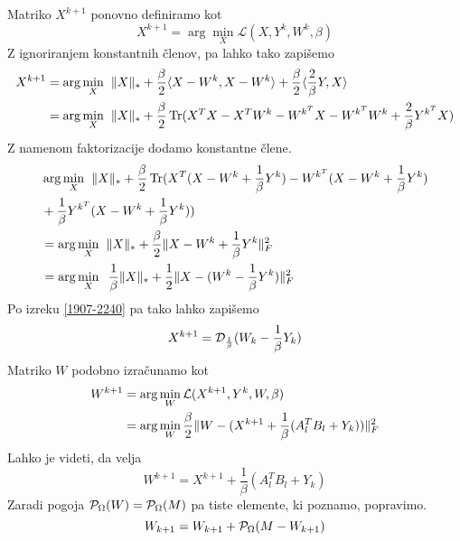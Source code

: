 Matriko $X^{k+1}$ ponovno definiramo kot
\[
    X^{k+1} = \arg \min_X \mathcal{L}(X, Y^k, W^k, \beta)
\]
Z ignoriranjem konstantnih členov, pa lahko tako zapišemo
\begin{align*}
    X^{k+1} & = \arg \min_X \hspace{0.2cm} \lVert X\rVert_* + \frac{\beta}{2}\langle X-W^k, X-W^k \rangle + \frac{\beta}{2}\langle \frac{2}{\beta}Y, X \rangle       \\
            & = \arg \min_X \hspace{0.2cm} \lVert X\rVert_* + \frac{\beta}{2}\operatorname{Tr}(X^TX - X^TW^k - W^{k^T}X - W^{k^T}W^k + \frac{2}{\beta}Y^{k^T}X )
\end{align*}
Z namenom faktorizacije dodamo konstantne člene.
\begin{align*}
     & \arg \min_X \hspace{0.2cm} \lVert X\rVert_* + \frac{\beta}{2}\operatorname{Tr}(X^T(X - W^k + \frac{1}{\beta}Y^k) - W^{k^T} (X - W^k + \frac{1}{\beta}Y^k) \\
     & +\frac{1}{\beta}Y^{k^T}(X - W^k + \frac{1}{\beta}Y^k))                                                               \\
     & = \arg \min_X \hspace{0.2cm} \lVert X\rVert_* + \frac{\beta}{2} \lVert X-W^k + \frac{1}{\beta}Y^k\rVert_F^2                                       \\
     & = \arg \min_X \hspace{0.2cm} \frac{1}{\beta}\lVert X\rVert_* +  \frac{1}{2}\lVert X-(W^k - \frac{1}{\beta}Y^k)\rVert_F^2
\end{align*}
 Po izreku \ref{1907-2240} pa tako lahko zapišemo
\[
    X^{k+1} = \mathcal{D}_\frac{1}{\beta}(W_k - \frac{1}{\beta} Y_k)
\]
Matriko $W$ podobno izračunamo kot
\begin{align*}
    W^{k+1} & = \arg \min_{W} \mathcal{L}(X^{k+1}, Y^k, W, \beta)                                       \\
            & = \arg \min_W \frac{\beta}{2} \lVert W - (X^{k+1} + \frac{1}{\beta}(A_l^T B_l + Y_k)) \rVert_F^2
\end{align*}
Lahko je videti, da velja
\[
    W^{k+1} = X^{k+1} + \frac{1}{\beta}(A_l^T B_l + Y_k)
\]
Zaradi pogoja $\mathcal{P}_\Omega(W) = \mathcal{P}_\Omega(M)$ pa tiste elemente, ki poznamo, popravimo. \cite{TNNM-HZYLH12}
\begin{equation}
    \label{2906-1248}
    W_{k+1} = W_{k+1} + \mathcal{P}_\Omega(M - W_{k+1})
\end{equation}
